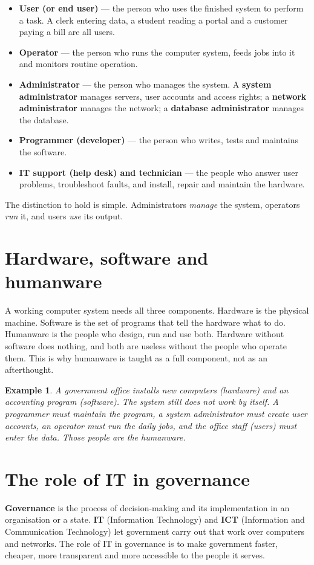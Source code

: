 \documentclass[11pt]{article}
\newtheorem{example}{Example}[section]
\begin{document}
\begin{itemize}
  \item \textbf{User (or end user)} --- the person who uses the finished
    system to perform a task. A clerk entering data, a student reading a
    portal and a customer paying a bill are all users.
  \item \textbf{Operator} --- the person who runs the computer system, feeds
    jobs into it and monitors routine operation.
  \item \textbf{Administrator} --- the person who manages the system. A
    \textbf{system administrator} manages servers, user accounts and access
    rights; a \textbf{network administrator} manages the network; a
    \textbf{database administrator} manages the database.
  \item \textbf{Programmer (developer)} --- the person who writes, tests and
    maintains the software.
  \item \textbf{IT support (help desk) and technician} --- the people who
    answer user problems, troubleshoot faults, and install, repair and
    maintain the hardware.
\end{itemize}

The distinction to hold is simple. Administrators \emph{manage} the system,
operators \emph{run} it, and users \emph{use} its output.

\section{Hardware, software and humanware}
A working computer system needs all three components. Hardware is the
physical machine. Software is the set of programs that tell the hardware what
to do. Humanware is the people who design, run and use both. Hardware without
software does nothing, and both are useless without the people who operate
them. This is why humanware is taught as a full component, not as an
afterthought.

\begin{example}
A government office installs new computers (hardware) and an accounting
program (software). The system still does not work by itself. A programmer
must maintain the program, a system administrator must create user accounts,
an operator must run the daily jobs, and the office staff (users) must enter
the data. Those people are the humanware.
\end{example}

\section{The role of IT in governance}
\textbf{Governance} is the process of decision-making and its implementation
in an organisation or a state. \textbf{IT} (Information Technology) and
\textbf{ICT} (Information and Communication Technology) let government carry
out that work over computers and networks. The role of IT in governance is to
make government faster, cheaper, more transparent and more accessible to the
people it serves.
\end{document}
